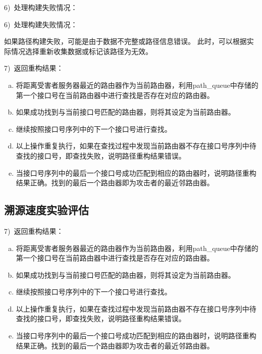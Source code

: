 \begin{enumerate}[a.]
\begin{enumerate}[a.]
\begin{enumerate}[a.]
\begin{enumerate}[a.]
\begin{enumerate}[a.]
\begin{enumerate}[a.]
\begin{enumerate}[a.]
6)~处理构建失败情况：\par
6)~处理构建失败情况：\par
如果路径构建失败，可能是由于数据不完整或路径信息错误。
此时，可以根据实际情况选择重新收集数据或标记该路径为无效。\par

7)~返回重构结果：\par
\begin{enumerate}[a.]
	\item 将距离受害者服务器最近的路由器作为当前路由器，利用path\_queue中存储的第一个接口号在当前路由器中进行查找是否存在对应的路由器。
	\item 如果成功找到与当前接口号匹配的路由器，则将其设定为当前路由器。
	\item 继续按照接口号序列中的下一个接口号进行查找。
	\item 以上操作重复执行，如果在查找过程中发现当前路由器不存在接口号序列中待查找的接口号，即查找失败，说明路径重构结果错误。
	\item 当接口号序列中的最后一个接口号成功匹配到相应的路由器时，说明路径重构结果正确。找到的最后一个路由器即为攻击者的最近邻路由器。
\end{enumerate}

\subsection{溯源速度实验评估}
7)~返回重构结果：\par
\begin{enumerate}[a.]
	\item 将距离受害者服务器最近的路由器作为当前路由器，利用path\_queue中存储的第一个接口号在当前路由器中进行查找是否存在对应的路由器。
	\item 如果成功找到与当前接口号匹配的路由器，则将其设定为当前路由器。
	\item 继续按照接口号序列中的下一个接口号进行查找。
	\item 以上操作重复执行，如果在查找过程中发现当前路由器不存在接口号序列中待查找的接口号，即查找失败，说明路径重构结果错误。
	\item 当接口号序列中的最后一个接口号成功匹配到相应的路由器时，说明路径重构结果正确。找到的最后一个路由器即为攻击者的最近邻路由器。
\end{enumerate}


\end{enumerate}
\end{enumerate}
\end{enumerate}
\end{enumerate}
\end{enumerate}
\end{enumerate}
\end{enumerate}
